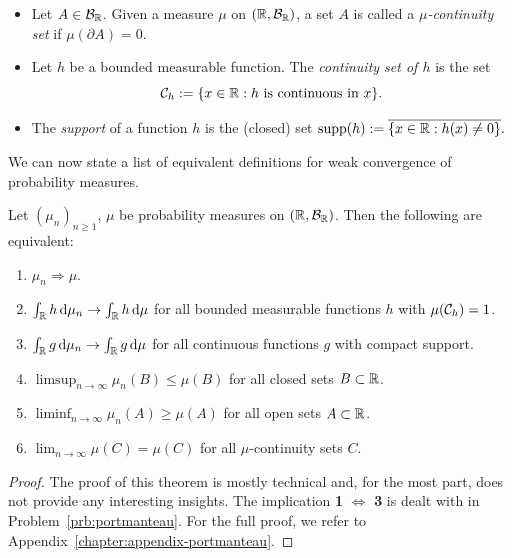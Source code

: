 \begin{definition}
	\begin{itemize}
		\item Let $A\in\mathcal B_{\mathbb R}$. Given a measure $\mu$ on $(\mathbb R, \mathcal B_{\mathbb R})$, a set $A$ is called a \emph{$\mu$-continuity set} if $\mu(\partial A) = 0$.
		\item Let $h$ be a bounded measurable function. The \emph{continuity set of $h$} is the set
		\[
			\mathcal C_h := \{ x\in \mathbb R : \text{$h$ is continuous in $x$}\}.
		\]
		\item The \emph{support} of a function $h$ is the (closed) set $\text{supp}(h) := \overline{\{x\in\mathbb R : h(x)\ne 0\}}.$
	\end{itemize}


\end{definition}

We can now state a list of equivalent definitions for weak convergence of probability measures.

\begin{theorem}\label{thm:portmanteau}
Let $(\mu_n)_{n \ge 1}$, $\mu$ be probability measures on $(\mathbb R, \mathcal B_{\mathbb R})$. Then the following are equivalent:
\begin{enumerate}[label={(\arabic*)}]
\item $\mu_n \Rightarrow \mu$.
\item $\int_{\mathbb R} h \, \mathrm{d} \mu_n \to \int_{\mathbb R} h \, \mathrm{d} \mu$ for all bounded measurable functions $h$ with $\mu(\mathcal C_h) = 1$.
\item $\int_{\mathbb R} g \, \mathrm{d} \mu_n \to \int_{\mathbb R} g \, \mathrm{d} \mu$ for all continuous functions $g$ with compact support.
\item $\limsup_{n \to \infty} \mu_n(B) \le \mu(B)$ for all closed sets $B \subset \mathbb R$.
\item $\liminf_{n \to \infty} \mu_n(A) \ge \mu(A)$ for all open sets $A \subset \mathbb R$.
\item $\lim_{n \to \infty} \mu(C) = \mu(C)$ for all $\mu$-continuity sets $C$.
\end{enumerate}
\end{theorem} 

\begin{proof}
The proof of this theorem is mostly technical and, for the most part, does not provide any interesting insights. The implication \textbf{1} $\iff$ \textbf{3} is dealt with in Problem~\ref{prb:portmanteau}. For the full proof, we refer to Appendix~\ref{chapter:appendix-portmanteau}. 
\end{proof}

